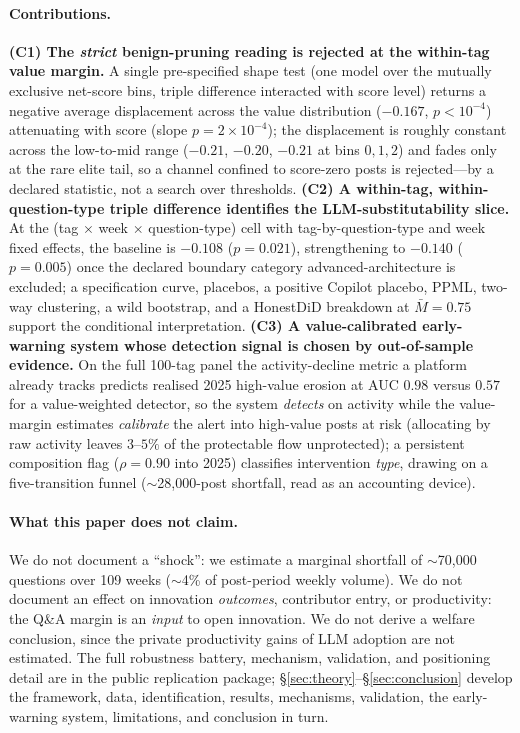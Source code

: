\paragraph{Contributions.}
\textbf{(C1) The \emph{strict} benign-pruning reading is rejected
at the within-tag value margin.} A single pre-specified shape
test (one model over the mutually exclusive net-score bins,
triple difference interacted with score level) returns a negative
average displacement across the value distribution ($-0.167$,
$p<10^{-4}$) attenuating with score (slope $p=2\times10^{-4}$);
the displacement is roughly constant across the low-to-mid range
($-0.21$, $-0.20$, $-0.21$ at bins $0,1,2$) and fades only at the
rare elite tail, so a channel confined to score-zero posts is
rejected---by a declared statistic, not a search over thresholds.
\textbf{(C2) A within-tag, within-question-type triple difference
identifies the LLM-substitutability slice.} At the
(tag $\times$ week $\times$ question-type) cell with
tag-by-question-type and week fixed effects, the baseline is
$-0.108$ ($p=0.021$), strengthening to $-0.140$ ($p=0.005$) once
the declared boundary category advanced-architecture is excluded;
a specification curve, placebos, a positive Copilot placebo,
PPML, two-way clustering, a wild bootstrap, and a HonestDiD
breakdown at $\bar M=0.75$ support the conditional interpretation.
\textbf{(C3) A value-calibrated early-warning system whose
detection signal is chosen by out-of-sample evidence.} On the
full 100-tag panel the activity-decline metric a platform already
tracks predicts realised 2025 high-value erosion at AUC $0.98$
versus $0.57$ for a value-weighted detector, so the system
\emph{detects} on activity while the value-margin estimates
\emph{calibrate} the alert into high-value posts at risk
(allocating by raw activity leaves $3$--$5\%$ of the protectable
flow unprotected); a persistent composition flag ($\rho=0.90$
into 2025) classifies intervention \emph{type}, drawing on a
five-transition funnel ($\sim$28{,}000-post shortfall, read as an
accounting device).

\paragraph{What this paper does not claim.}
We do not document a ``shock'': we estimate a marginal shortfall
of $\sim$70{,}000 questions over 109 weeks ($\sim$4\% of
post-period weekly volume). We do not document an effect on
innovation \emph{outcomes}, contributor entry, or productivity:
the Q\&A margin is an \emph{input} to open innovation. We do not
derive a welfare conclusion, since the private productivity gains
of LLM adoption
\citep{brynjolfsson2025generative,peng2023impact,cui2024effects}
are not estimated. The full robustness battery, mechanism,
validation, and positioning detail are in the public replication
package; \S\ref{sec:theory}--\S\ref{sec:conclusion} develop the
framework, data, identification, results, mechanisms, validation,
the early-warning system, limitations, and conclusion in turn.
